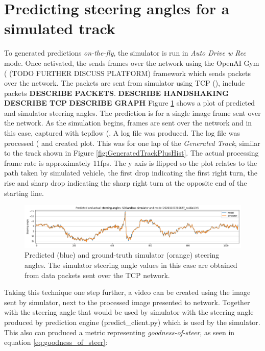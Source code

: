 
\section{Predicting steering angles for a simulated track}

To generated predictions \textit{on-the-fly}, the simulator is run in \textit{Auto Drive w Rec} mode. Once activated, the sends frames over the network using the OpenAI Gym (\cite{brockman2016openai} (TODO FURTHER DISCUSS PLATFORM) framework which sends packets over the network. The packets are sent from simulator using TCP (\cite{rfc793}), include packets \textbf{DESCRIBE PACKETS}.  
\textbf{DESCRIBE HANDSHAKING} \textbf{DESCRIBE TCP} 
\textbf{DESCRIBE GRAPH}
Figure \ref{fig:PredSteeringAnglestcpflowNvidia1} shows a plot of predicted and simulator steering angles. The prediction is for a single image frame sent over the network. As the simulation begins, frames are sent over the network and in this case, captured with tcpflow (\cite{garfinkel2013passive}. A log file was produced. The log file was processed (\cite{JUPYTERNOTEBOOKINAPPENDIX} and created plot. This was for one lap of the \textit{Generated Track}, similar to the track shown in Figure \ref{fig:GeneratedTrackPlusHist}. The actual processing frame rate is approximately 11fps. The y axis is flipped so the plot relates to the path taken by simulated vehicle, the first drop indicating the first right turn, the rise and sharp drop indicating the sharp right turn at the opposite end of the starting line.

\begin{figure}[ht]
 \centering 
 \includegraphics[width=\textwidth]{Figures/PredSteeringAnglestcpflowNvidia1.png}
 \caption{Predicted (blue) and ground-truth simulator (orange) steering angles. The simulator steering angle values in this case are obtained from data packets sent over the TCP network.}
 \label{fig:PredSteeringAnglestcpflowNvidia1}
\end{figure}

Taking this technique one step further, a video can be created using the image sent by simulator, next to the processed image presented to network. Together with the steering angle that would be used by simulator with the steering angle produced by prediction engine (predict\_client.py) which is used by the simulator.
This also can produced a metric representing \textit{goodness-of-steer}, as seen in equation     \ref{eq:goodness_of_steer}:

